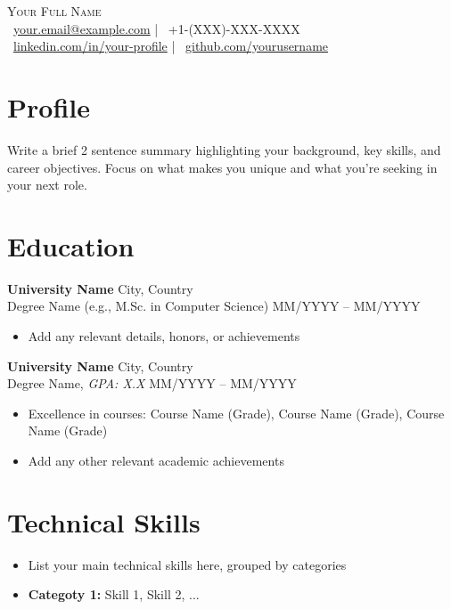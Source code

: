 \documentclass[a4paper,11pt]{article}
\newcommand{\contactInfo}[1]{\textcolor{mainblue}{\small#1}}
\newcommand{\runsubsection}[1]{\textcolor{mainblue}{\bfseries #1}\normalfont}
\newcommand{\location}[1]{\textcolor{maingray}{\small #1}}
\begin{document}
\begin{center}
    {\Huge \scshape Your Full Name} \\[5pt]
    \contactInfo{
        \faEnvelope\ \href{mailto:your.email@example.com}{your.email@example.com} \quad | \quad 
        \faPhone\ +1-(XXX)-XXX-XXXX \\[5pt]
        \faLinkedin\ \href{https://linkedin.com/in/your-profile}{linkedin.com/in/your-profile} \quad | \quad
        \faGithub\ \href{https://github.com/yourusername}{github.com/yourusername}
    }
\end{center}

\section{Profile}
Write a brief 2 sentence summary highlighting your background, key skills, and career objectives. Focus on what makes you unique and what you're seeking in your next role.

\section{Education}
\runsubsection{University Name} \hfill \location{City, Country}\\[2pt]
Degree Name (e.g., M.Sc. in Computer Science) \hfill \location{MM/YYYY -- MM/YYYY}
\begin{itemize}
    \item Add any relevant details, honors, or achievements
\end{itemize}

\runsubsection{University Name} \hfill \location{City, Country}\\[2pt]
Degree Name, \textit{GPA: X.X} \hfill \location{MM/YYYY -- MM/YYYY}
\begin{itemize}
    \item Excellence in courses: Course Name (Grade), Course Name (Grade), Course Name (Grade)
    \item Add any other relevant academic achievements
\end{itemize}

\section{Technical Skills}
\begin{itemize}
    \item List your main technical skills here, grouped by categories
    \item \textbf{Categoty 1:} Skill 1, Skill 2, ...
\end{itemize}
\end{document}

